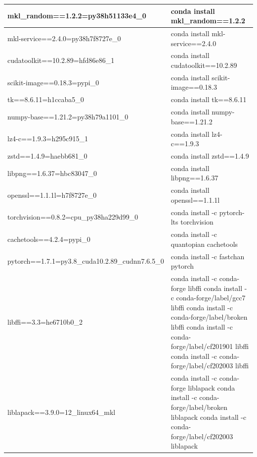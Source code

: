 \begin{tabular}{ |p{8cm}||p{8cm}|  }
  mkl\_random==1.2.2=py38h51133e4\_0&	conda install mkl\_random==1.2.2\\
\hline


  mkl-service==2.4.0=py38h7f8727e\_0&	conda install mkl-service==2.4.0\\
\hline


  cudatoolkit==10.2.89=hfd86e86\_1&	conda install cudatoolkit==10.2.89\\
\hline


  scikit-image==0.18.3=pypi\_0&	conda install scikit-image==0.18.3\\
\hline


  tk==8.6.11=h1ccaba5\_0&	conda install tk==8.6.11\\
\hline


  numpy-base==1.21.2=py38h79a1101\_0&	conda install numpy-base==1.21.2\\
\hline


  lz4-c==1.9.3=h295c915\_1&	conda install lz4-c==1.9.3\\
\hline



   zstd==1.4.9=haebb681\_0&	conda install zstd==1.4.9\\
\hline


   libpng==1.6.37=hbc83047\_0&	conda install libpng==1.6.37\\
\hline


   openssl==1.1.1l=h7f8727e\_0&	conda install openssl==1.1.1l\\
\hline


 torchvision==0.8.2=cpu\_py38ha229d99\_0&	conda install -c pytorch-lts torchvision\\
\hline



  cachetools==4.2.4=pypi\_0&	conda install -c quantopian cachetools\\
\hline


  pytorch==1.7.1=py3.8\_cuda10.2.89\_cudnn7.6.5\_0&	conda install -c fastchan pytorch\\
\hline

libffi==3.3=he6710b0\_2&conda install -c conda-forge libffi \hline conda install -c conda-forge/label/gcc7 libffi \hline conda install -c conda-forge/label/broken libffi \hline conda install -c conda-forge/label/cf201901 libffi \hline conda install -c conda-forge/label/cf202003 libffi\\

\hline

  liblapack==3.9.0=12\_linux64\_mkl&	conda install -c conda-forge liblapack \hline 	conda install -c conda-forge/label/broken liblapack \hline	conda install -c conda-forge/label/cf202003 liblapack\\
\hline


\end{tabular}
